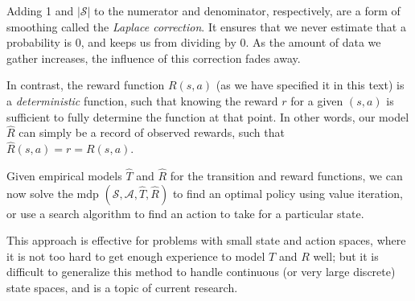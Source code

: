 Adding 1 and $\left|\mathcal{S}\right|$ to the numerator and
denominator, respectively, are a form of smoothing called the {\em
    Laplace correction}. It ensures that we never estimate that a probability is
0, and keeps us from dividing by 0.   As the amount of data we gather
increases, the influence of this correction fades away.

In contrast, the reward function ${R}(s, a)$
(as we have specified it in this text) is a {\em deterministic}
function, such that knowing the reward $r$ for a given $(s, a)$ is
sufficient to fully determine the function at that point.  In other
words, our model $\hat{R}$ can simply be a record of observed rewards,
such that $\hat{R}(s, a) = r = R(s,a)$.


Given empirical models $\hat{T}$ and $\hat{R}$ for the transition and
reward functions, we can now solve the {\sc mdp} $(\mathcal{S},
  \mathcal{A}, \hat{T}, \hat{R})$ to find an optimal policy using value
iteration, or use a search algorithm to find an action
to take for a particular state.

This approach is effective for problems with small state and action
spaces, where it is not too hard to get enough experience to model $T$
and $R$ well; but it is difficult to generalize this method to handle
continuous (or very large discrete) state spaces, and is a topic of
current research.

